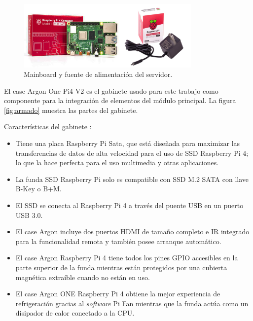 \begin{figure}[htpb]
\centering 
\includegraphics[width=0.8\textwidth]{./Figures/placa.png}
\caption{Mainboard y fuente de alimentación del servidor.}
\label{fig:placarpi4}
\end{figure}
El case Argon One Pi4 V2 es el gabinete usado para este trabajo como componente para la integración de elementos del módulo principal. La figura \ref{fig:armado} muestra las partes del gabinete.  

Características del gabinete \citep{WEBSITE:16}:

\begin{itemize}
\item Tiene una placa Raspberry Pi Sata, que está diseñada para maximizar las transferencias de datos de alta velocidad para el uso de SSD Raspberry Pi 4; lo que la hace perfecta para el uso multimedia y otras aplicaciones. 
\item La funda SSD Raspberry Pi solo es compatible con SSD M.2 SATA con llave B-Key o B+M.
\item El SSD se conecta al Raspberry Pi 4 a través del puente USB en un puerto USB 3.0. 
\item El case Argon incluye dos puertos HDMI de tamaño completo e IR integrado para la funcionalidad remota y también posee arranque automático. 
\item El case Argon Raspberry Pi 4 tiene todos los pines GPIO accesibles en la parte superior de la funda mientras están protegidos por una cubierta magnética extraíble cuando no están en uso. 
\item El case Argon ONE Raspberry Pi 4 obtiene la mejor experiencia de refrigeración gracias al \emph{software} Pi Fan \citep{WEBSITE:42} mientras que la funda actúa como un disipador de calor conectado a la CPU.
\end{itemize}


